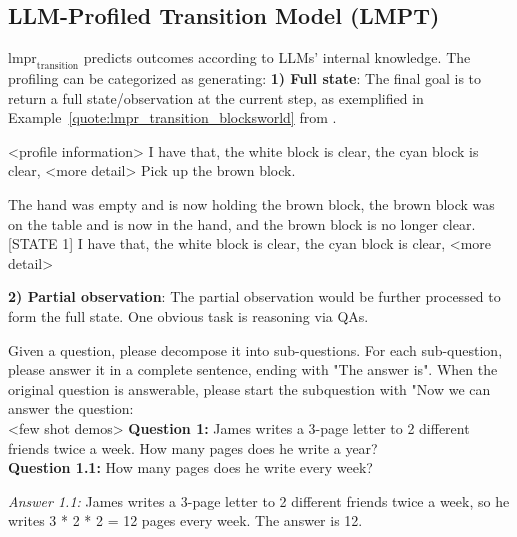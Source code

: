 \subsection{LLM-Profiled Transition Model (LMPT)}
\label{sec:transition_models}
$\text{lmpr}_\text{transition}$ predicts outcomes according to LLMs' internal knowledge. The profiling can be categorized as generating:
\textbf{1) Full state}: The final goal is to return a full state/observation at the current step, as exemplified in Example~\ref{quote:lmpr_transition_blocksworld} from \citet{hao-etal-2023-reasoning}.
\begin{numberedquote}
    <profile information> \newline
    [STATE 0] I have that, the white block is clear, the cyan block is clear, 
    <more detail> \newline
    [ACTION] Pick up the brown block.\newline
    [CHANGE] \newline
    \begin{myshadowbox}
    The hand was empty and is now holding the brown block, the brown block was on the table and is now in the hand, and the brown block is no longer clear.
    [STATE 1] I have that, the white block is clear, the cyan block is clear, 
    <more detail>
    \end{myshadowbox}
    \label{quote:lmpr_transition_blocksworld}
\end{numberedquote}
\textbf{2) Partial observation}: The partial observation would be further processed to form the full state. One obvious task is reasoning via QAs.

\begin{numberedquote}
    Given a question, please decompose it into sub-questions. For each sub-question, please answer it in a complete sentence, ending with "The answer is". When the original question is answerable, please start the subquestion with "Now we can answer the question: \\
    <few shot demos> \newline
    \textbf{Question 1:} James writes a 3-page letter to 2 different friends twice a week. How many pages does he write a year? \\
    \textbf{Question 1.1:} How many pages does he write every week? 
    \begin{myshadowbox}
    \textit{Answer 1.1:} James writes a 3-page letter to 2 different friends twice a week, so he writes 3 * 2 * 2 = 12 pages every week. The answer is 12.
     \end{myshadowbox}
     \label{quote:lmpr_transition_qa}
\end{numberedquote}
      
